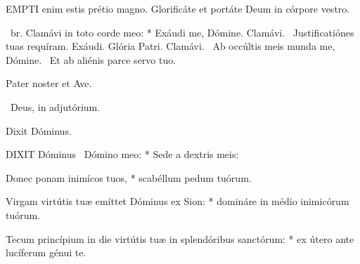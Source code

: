 \lettrine[lines=2]{E}{MPTI} enim estis prétio magno. Glorificáte et portáte Deum in córpore vestro.

\R\ br. Clamávi in toto corde meo: * Exáudi me, Dómine. Clamávi. \V\ Justificatiónes tuas requíram. Exáudi. Glória Patri. Clamávi. \V\ Ab occúltis meis munda me, Dómine. \R\ Et ab aliénis parce servo tuo.



Pater noster et Ave.

\V\ Deus, in adjutórium.

 Dixit Dóminus. \textdagger



\lettrine[lines=2]{D}{IXIT} Dóminus \textdagger\ Dómino meo: * Sede a dextris meis:

Donec ponam inimícos tuos, * scabéllum pedum tuórum.

Virgam virtútis tuæ emíttet Dóminus ex Sion: * domináre in médio inimicórum tuórum.

Tecum princípium in die virtútis tuæ in splendóribus sanctórum: * ex útero ante lucíferum génui te.

